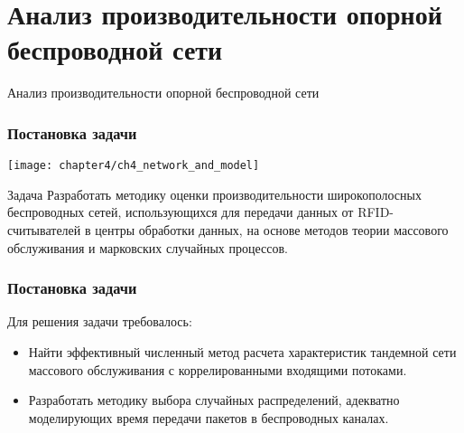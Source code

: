 \section{Анализ производительности опорной беспроводной сети}
\begin{frame}
    \begin{center}
        \Huge
        Анализ производительности опорной беспроводной сети
    \end{center}
\end{frame}

\begin{frame}
    \frametitle{Постановка задачи}
    \begin{center}
        \texttt{[image: chapter4/ch4\_network\_and\_model]}
    \end{center}
    \small
    \begin{alertblock}{Задача}
        Разработать методику оценки производительности широкополосных беспроводных сетей, использующихся для передачи данных от RFID-считывателей в центры обработки данных, на основе методов теории массового обслуживания и марковских случайных процессов.
    \end{alertblock}
\end{frame}

\begin{frame}
    \frametitle{Постановка задачи}
    Для решения задачи требовалось:
    \begin{itemize}
        \item Найти эффективный численный метод расчета характеристик тандемной сети массового обслуживания с коррелированными входящими потоками.
        \item Разработать методику выбора случайных распределений, адекватно моделирующих время передачи пакетов в беспроводных каналах.
    \end{itemize}
    \vfill
\end{frame}


